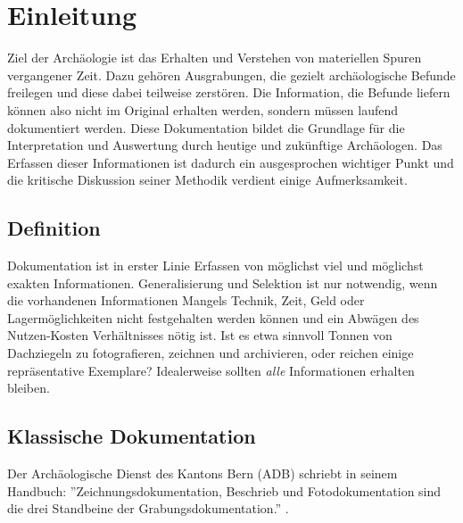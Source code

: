 \chapter{Einleitung}
	Ziel der Archäologie ist das Erhalten und Verstehen von materiellen Spuren vergangener Zeit. Dazu gehören Ausgrabungen, die gezielt archäologische Befunde freilegen und diese dabei teilweise zerstören. Die Information, die Befunde liefern können also nicht im Original erhalten werden, sondern müssen laufend dokumentiert werden. Diese Dokumentation bildet die Grundlage für die Interpretation und Auswertung durch heutige und zukünftige Archäologen.
	Das Erfassen dieser Informationen ist dadurch ein ausgesprochen wichtiger Punkt und die kritische Diskussion seiner Methodik verdient einige Aufmerksamkeit.
	
	\section{Definition}
		Dokumentation ist in erster Linie Erfassen von möglichst viel und möglichst exakten Informationen. Generalisierung und Selektion ist nur notwendig, wenn die vorhandenen Informationen Mangels Technik, Zeit, Geld oder Lagermöglichkeiten nicht festgehalten werden können und ein Abwägen des Nutzen-Kosten Verhältnisses nötig ist. Ist es etwa sinnvoll Tonnen von Dachziegeln zu fotografieren, zeichnen und archivieren, oder reichen einige repräsentative Exemplare?
		Idealerweise sollten \emph{alle} Informationen erhalten bleiben.
		
	\section{Klassische Dokumentation}
		Der Archäologische Dienst des Kantons Bern (ADB) schriebt in seinem Handbuch: ''Zeichnungsdokumentation, Beschrieb und Fotodokumentation sind die drei Standbeine der Grabungsdokumentation.'' .
		
